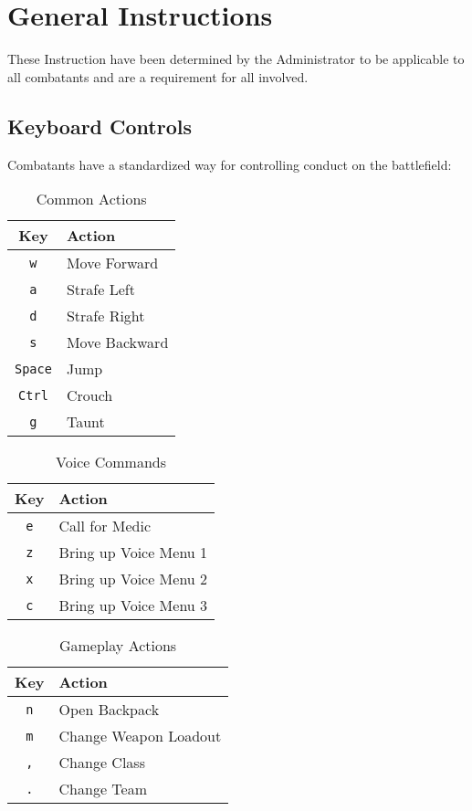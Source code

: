 \section{General Instructions}
\label{general_instructions}

These Instruction have been determined by the Administrator to be applicable to all combatants and are a requirement for all involved. 

\subsection{Keyboard Controls}
Combatants have a standardized way for controlling conduct on the battlefield:

\begin{table}[h!b!p!]
\caption{Common Actions}
\begin{tabular}{|c|l|}
	\hline
		Key & Action\\
	\hline
	\texttt{w}&Move Forward\\
	\texttt{a}&Strafe Left\\
	\texttt{d}&Strafe Right\\
	\texttt{s}&Move Backward\\
	\texttt{Space}&Jump\\
	\texttt{Ctrl}&Crouch\\
	\texttt{g}&Taunt\\
  	\hline
\end{tabular}
\label{table_common_actions}
\end{table}

\begin{table}[h!b!p!]
\caption{Voice Commands}
\begin{tabular}{|c|l|}
	\hline
		Key & Action\\
	\hline
	\texttt{e}&Call for Medic\\
	\texttt{z}&Bring up Voice Menu 1\\
	\texttt{x}&Bring up Voice Menu 2\\
	\texttt{c}&Bring up Voice Menu 3\\
  	\hline
\end{tabular}
\label{table_common_actions}
\end{table}

\begin{table}[h!b!p!]
\caption{Gameplay Actions}
\begin{tabular}{|c|l|}
	\hline
		Key & Action\\
	\hline
	\texttt{n}&Open Backpack\\
	\texttt{m}&Change Weapon Loadout\\
	\texttt{,}&Change Class\\
	\texttt{.}&Change Team\\
  	\hline
\end{tabular}
\label{table_common_actions}
\end{table}

